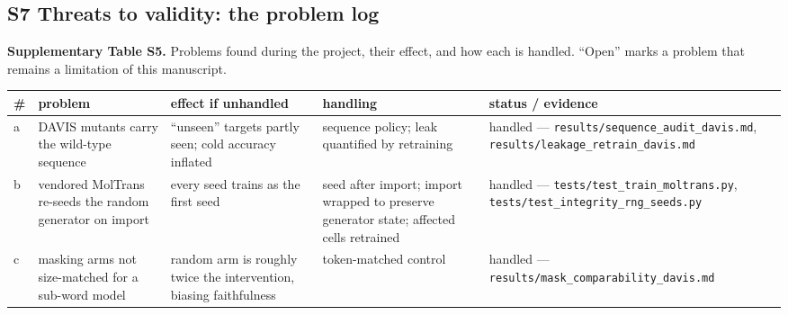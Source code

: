 \documentclass[
  10pt,
]{article}
\begin{document}
\subsection{S7 Threats to validity: the problem log}\label{s7-threats-to-validity-the-problem-log}

\textbf{Supplementary Table S5.} Problems found during the project, their effect, and how each is handled. ``Open'' marks a problem that remains a limitation of this manuscript.

\begin{longtable}[]{@{}
  >{\raggedright\arraybackslash}p{}
  >{\raggedright\arraybackslash}p{}
  >{\raggedright\arraybackslash}p{}
  >{\raggedright\arraybackslash}p{}
  >{\raggedright\arraybackslash}p{}@{}}
\toprule\noalign{}
\begin{minipage}[b]{\linewidth}\raggedright
\#
\end{minipage} & \begin{minipage}[b]{\linewidth}\raggedright
problem
\end{minipage} & \begin{minipage}[b]{\linewidth}\raggedright
effect if unhandled
\end{minipage} & \begin{minipage}[b]{\linewidth}\raggedright
handling
\end{minipage} & \begin{minipage}[b]{\linewidth}\raggedright
status / evidence
\end{minipage} \\
\midrule\noalign{}
\endhead
\bottomrule\noalign{}
\endlastfoot
a & DAVIS mutants carry the wild-type sequence & ``unseen'' targets partly seen; cold accuracy inflated & sequence policy; leak quantified by retraining & handled --- \texttt{results/sequence\_audit\_davis.md}, \texttt{results/leakage\_retrain\_davis.md} \\
b & vendored MolTrans re-seeds the random generator on import & every seed trains as the first seed & seed after import; import wrapped to preserve generator state; affected cells retrained & handled --- \texttt{tests/test\_train\_moltrans.py}, \texttt{tests/test\_integrity\_rng\_seeds.py} \\
c & masking arms not size-matched for a sub-word model & random arm is roughly twice the intervention, biasing faithfulness & token-matched control & handled --- \texttt{results/mask\_comparability\_davis.md} \\

\end{longtable}
\end{document}
